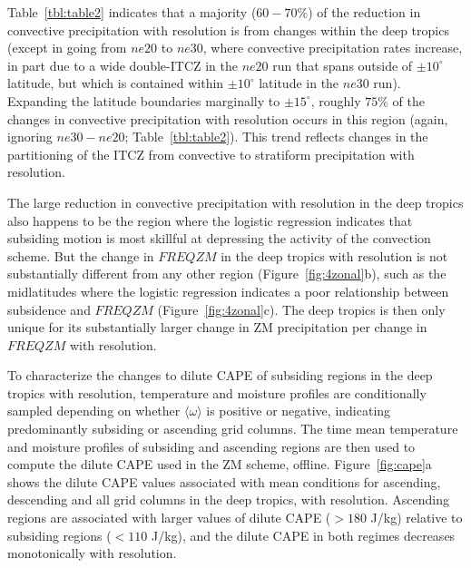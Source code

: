 \documentclass[alpha-refs]{wiley-article}
\begin{document}
Table~\ref{tbl:table2} indicates that a majority ($60-70 \%$) of the reduction in convective precipitation with resolution is from changes within the deep tropics (except in going from $ne20$ to $ne30$, where convective precipitation rates increase, in part due to a wide double-ITCZ in the $ne20$ run that spans outside of $\pm 10^{\circ}$ latitude, but which is contained within $\pm 10^{\circ}$ latitude in the $ne30$ run). Expanding the latitude boundaries marginally to $\pm 15^{\circ}$, roughly $75\%$ of the changes in convective precipitation with resolution occurs in this region (again, ignoring $ne30-ne20$; Table~\ref{tbl:table2}). This trend reflects changes in the partitioning of the ITCZ from convective to stratiform precipitation with resolution. 

The large reduction in convective precipitation with resolution in the deep tropics also happens to be the region where the logistic regression indicates that subsiding motion is most skillful at depressing the activity of the convection scheme. But the change in $FREQZM$ in the deep tropics with resolution is not substantially different from any other region (Figure~\ref{fig:4zonal}b), such as the midlatitudes where the logistic regression indicates a poor relationship between subsidence and $FREQZM$ (Figure~\ref{fig:4zonal}c). The deep tropics is then only unique for its substantially larger change in ZM precipitation per change in $FREQZM$ with resolution.

To characterize the changes to dilute CAPE of subsiding regions in the deep tropics with resolution, temperature and moisture profiles are conditionally sampled depending on whether $\langle \omega \rangle$ is positive or negative, indicating predominantly subsiding or ascending grid columns. The time mean temperature and moisture profiles of subsiding and ascending regions are then used to compute the dilute CAPE used in the ZM scheme, offline. Figure~\ref{fig:cape}a shows the dilute CAPE values associated with mean conditions for ascending, descending and all grid columns in the deep tropics, with resolution. Ascending regions are associated with larger values of dilute CAPE ($>180$ J/kg) relative to subsiding regions ($<110$ J/kg), and the dilute CAPE in both regimes decreases monotonically with resolution. 
\end{document}
